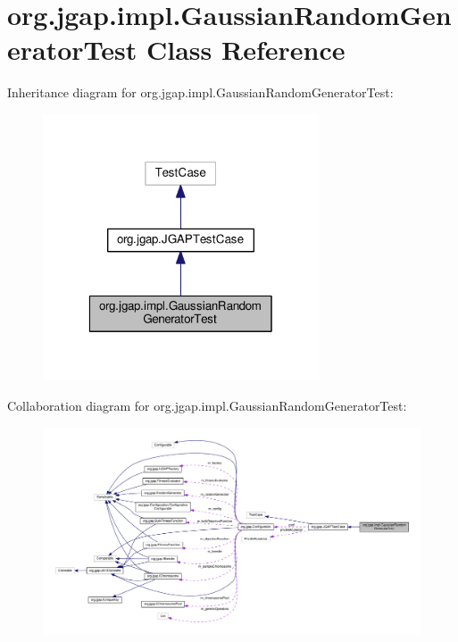 \hypertarget{classorg_1_1jgap_1_1impl_1_1_gaussian_random_generator_test}{\section{org.\-jgap.\-impl.\-Gaussian\-Random\-Generator\-Test Class Reference}
\label{classorg_1_1jgap_1_1impl_1_1_gaussian_random_generator_test}
}


Inheritance diagram for org.\-jgap.\-impl.\-Gaussian\-Random\-Generator\-Test\-:
\nopagebreak
\begin{figure}[H]
\begin{center}
\leavevmode
\includegraphics[width=232pt]{classorg_1_1jgap_1_1impl_1_1_gaussian_random_generator_test__inherit__graph}
\end{center}
\end{figure}


Collaboration diagram for org.\-jgap.\-impl.\-Gaussian\-Random\-Generator\-Test\-:
\nopagebreak
\begin{figure}[H]
\begin{center}
\leavevmode
\includegraphics[width=350pt]{classorg_1_1jgap_1_1impl_1_1_gaussian_random_generator_test__coll__graph}
\end{center}
\end{figure}
